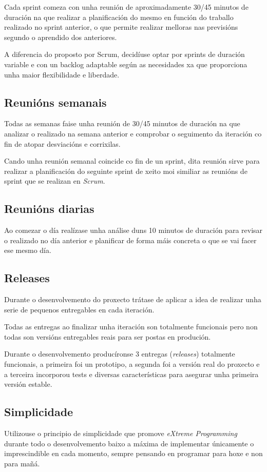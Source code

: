     Cada sprint comeza con unha reunión de aproximadamente 30/45 minutos de 
duración na que realizar a planificación do mesmo en función do 
traballo realizado no sprint anterior, o que permite realizar melloras nas 
previsións segundo o aprendido dos anteriores.

    A diferencia do proposto por Scrum, decidíuse optar por sprints de duración 
variable e con un backlog adaptable según as necesidades xa que proporciona 
unha maior flexibilidade e liberdade.

    \subsection{Reunións semanais}
    Todas as semanas faise unha reunión de 30/45 minutos de duración na que 
analizar o realizado na semana anterior e comprobar o seguimento da iteración 
co fin de atopar desviacións e corrixilas.

    Cando unha reunión semanal coincide co fin de un sprint, dita reunión 
sirve para realizar a planificación do seguinte sprint de xeito moi similiar as 
reunións de sprint que se realizan en \emph{Scrum}.

    \subsection{Reunións diarias}
    Ao comezar o día realízase unha análise duns 10 minutos de duración para 
revisar o realizado no día anterior e planificar de forma máis concreta o que 
se vai facer ese mesmo día.

    \subsection{Releases}
    Durante o desenvolvemento do proxecto trátase de aplicar a idea de realizar 
unha serie de pequenos entregables en cada iteración.

    Todas as entregas ao finalizar unha iteración son totalmente funcionais 
pero non todas son versións entregables reais para ser postas en produción.

    Durante o desenvolvemento producíronse 3 entregas (\emph{releases}) 
totalmente funcionais, a primeira foi un prototipo, a segunda foi a versión 
real do proxecto e a terceira incorporou tests e diversas características para 
asegurar unha primeira versión estable.

    \subsection{Simplicidade}
    Utilizouse o principio de simplicidade que promove \emph{eXtreme Programming}
    durante todo o desenvolvemento baixo a máxima de implementar únicamente o
    imprescindible en cada momento, sempre pensando en programar para hoxe e non para
    mañá.%

